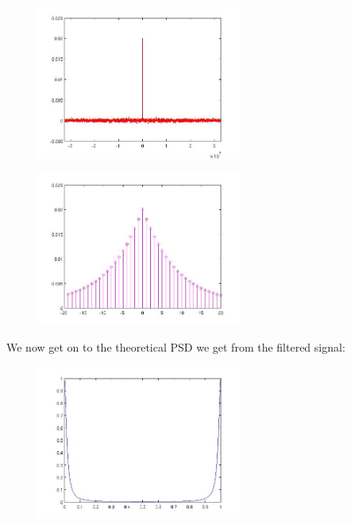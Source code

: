\documentclass[a4paper,11pt]{article}
\begin{document}
\begin{figure}[!hp]
    \begin{center}
    \includegraphics[width=0.6\textwidth]{images/lab2_redo_figure13.jpg}
    \end{center}
\end{figure}

\begin{figure}[!hp]
    \begin{center}
    \includegraphics[width=0.6\textwidth]{images/lab2_redo_figure14.jpg}
    \end{center}
\end{figure}

\newpage

We now get on to the theoretical PSD we get from the filtered signal:

\begin{figure}[!hp]
    \begin{center}
    \includegraphics[width=0.6\textwidth]{images/lab2_redo_figure2.jpg}
    \end{center}
\end{figure}
\end{document}
